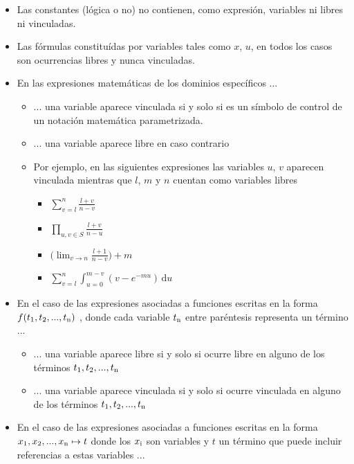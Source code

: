\begin{itemize}
	\item{Las constantes (lógica o no) no contienen, como expresión, variables ni libres ni vinculadas.}
	\item{Las fórmulas constituídas por variables tales como $x$, $u$, en todos los casos son ocurrencias libres y nunca vinculadas.}
	\item{En las expresiones matemáticas de los dominios específicos ...}
		\begin{itemize}
			\item{... una variable aparece vinculada si  y solo si es un símbolo de control de un notación matemática parametrizada.}
			\item{... una variable aparece libre en caso contrario}
			\item{Por ejemplo, en las siguientes expresiones las variables $u$, $v$ aparecen vinculada mientras que $l$, $m$ y $n$ cuentan como variables libres}
			\begin{itemize}
				\item{${\displaystyle \sum _{v=l}^{n}\frac{l+v}{n-v}}$} 
				\item{${\displaystyle \prod_{u,v \in S}{\frac{l+v}{n-u}}}$}
				\item{$\bigg({\displaystyle \lim_{v \to n}{\frac{l+1}{n-v}}}\bigg) + m$}
				\item{${\displaystyle \sum _{v=l}^{n}\int_{u=0}^{m-v}{(v-e^{-mu})\,\mathrm{d}u}}$} 
			\end{itemize}
		\end{itemize}
	\item{En el caso de las expresiones asociadas a funciones escritas en la forma $f(t\textsubscript{1}, t\textsubscript{2}, ..., t\textsubscript{n})$ , donde cada variable $t\textsubscript{n}$ entre paréntesis representa un término ... }
		\begin{itemize}
			\item{... una variable aparece libre si y solo si ocurre libre en alguno de los términos $t\textsubscript{1}, t\textsubscript{2}, ..., t\textsubscript{n}$}
			\item{... una variable aparece vinculada si  y solo si ocurre vinculada en alguno de los términos $t\textsubscript{1}, t\textsubscript{2}, ..., t\textsubscript{n}$}
		\end{itemize}
	\item{En el caso de las expresiones asociadas a funciones escritas en la forma $x\textsubscript{1}, x\textsubscript{2}, ..., x\textsubscript{n} \mapsto t$ donde los $x\textsubscript{i}$ son variables y $t$ un término que puede incluir referencias a estas variables ... }

\end{itemize}
